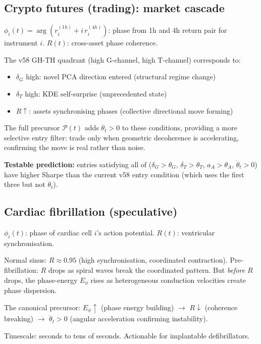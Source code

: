 \documentclass[11pt,a4paper]{article}
\theoremstyle{definition}
\begin{document}
\subsection{Crypto futures (trading): market cascade}

$\phi_i(t) = \arg(r_i^{(1h)} + i\,r_i^{(4h)})$: phase from 1h and 4h return pair for instrument $i$.
$R(t)$: cross-asset phase coherence.

The v58 GH-TH quadrant (high G-channel, high T-channel) corresponds to:
\begin{itemize}
\item $\delta_G$ high: novel PCA direction entered (structural regime change)
\item $\delta_T$ high: KDE self-surprise (unprecedented state)
\item $R \uparrow$: assets synchronising phases (collective directional move forming)
\end{itemize}

The full precursor $\mathcal{P}(t)$ adds $\ddot\theta_t > 0$ to these conditions,
providing a more selective entry filter: trade only when geometric decoherence
is accelerating, confirming the move is real rather than noise.

\textbf{Testable prediction:} entries satisfying all of ($\delta_G > \theta_G$, $\delta_T > \theta_T$, $a_A > \theta_A$, $\ddot\theta_t > 0$) have higher Sharpe than the current v58 entry condition (which uses the first three but not $\ddot\theta_t$).

\subsection{Cardiac fibrillation (speculative)}

$\phi_i(t)$: phase of cardiac cell $i$'s action potential.
$R(t)$: ventricular synchronisation.

Normal sinus: $R \approx 0.95$ (high synchronisation, coordinated contraction).
Pre-fibrillation: $R$ drops as spiral waves break the coordinated pattern.
But \emph{before} $R$ drops, the phase-energy $E_\phi$ rises
as heterogeneous conduction velocities create phase dispersion.

The canonical precursor:
$E_\phi \uparrow$ (phase energy building) $\to$ $R \downarrow$ (coherence breaking)
$\to$ $\ddot\theta_t > 0$ (angular acceleration confirming instability).

Timescale: seconds to tens of seconds. Actionable for implantable defibrillators.
\end{document}
